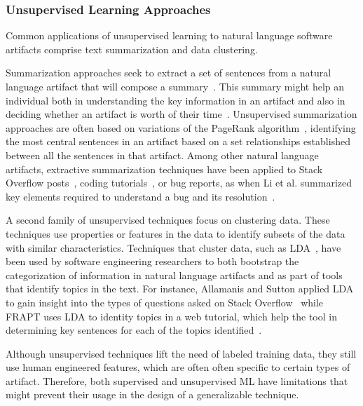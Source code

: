 \subsubsection{Unsupervised Learning Approaches}



Common applications of unsupervised learning 
to natural language software artifacts 
comprise text summarization and data clustering.


Summarization approaches seek to
extract a set of sentences 
from a natural language artifact that will compose a summary~\cite{Goldsteinet1999}.
This summary might help an individual both in understanding the key information in an 
artifact and also in deciding whether an artifact is worth of their time~\cite{Lotufo2012}.
Unsupervised summarization approaches are often based on 
variations of the PageRank algorithm~\cite{Page1999}, identifying
the most central sentences in an artifact based on a set relationships
established between all the sentences in that artifact.
Among other natural language artifacts,
extractive summarization techniques
have been applied to Stack Overflow posts~\cite{Ponzanelli2015},
coding tutorials~\cite{Li2018},
or bug reports, as
when Li et al. summarized 
key elements required to understand a bug and its resolution~\cite{li2018deep}.




A second family of unsupervised techniques focus on clustering data.
These techniques use properties or features in the data to 
identify 
subsets of the data with similar characteristics. 
Techniques that cluster data, such as \acf{LDA}~\cite{blei2003latent},
have been used by software engineering researchers to both 
bootstrap the categorization of information in 
natural language artifacts and as part of tools that identify topics in the text. 
For instance, Allamanis and Sutton
applied \acs{LDA}
to gain insight into the types of questions 
asked on Stack Overflow~\cite{Allamanis2013}
while FRAPT
uses \acs{LDA} to identity topics in a web tutorial,
which help the tool in determining 
key sentences for each of the topics identified~\cite{Jiang2017}.



Although unsupervised techniques lift the need of labeled training data,
they still use human engineered features, 
which are often often specific to certain 
types of artifact. Therefore, 
both supervised and unsupervised \acs{ML}
have limitations that might prevent their usage 
in the design of a generalizable technique.






